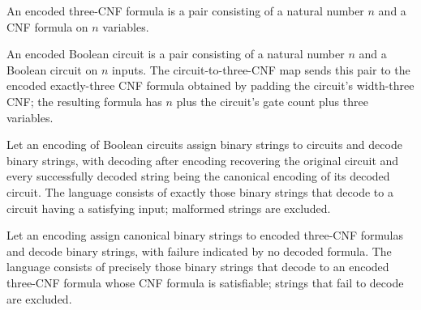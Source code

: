 \begin{definition}
\label{FABL.EncodedThreeCNF}
\leanok
{}
An encoded three-CNF formula is a pair consisting of a natural number $n$ and a CNF
formula on $n$ variables.
\end{definition}

\begin{definition}
\label{FABL.circuitToThreeCNF}
\leanok
{}
An encoded Boolean circuit is a pair consisting of a natural number $n$ and a Boolean
circuit on $n$ inputs. The circuit-to-three-CNF map sends this pair to the encoded
exactly-three CNF formula obtained by padding the circuit's width-three CNF; the
resulting formula has $n$ plus the circuit's gate count plus three variables.
\end{definition}

\begin{definition}
\label{FABL.encodedCircuitSatLanguage}
\leanok
{}
Let an encoding of Boolean circuits assign binary strings to circuits and decode binary
strings, with decoding after encoding recovering the original circuit and every
successfully decoded string being the canonical encoding of its decoded circuit. The
language consists of exactly those binary strings that decode to a circuit having a
satisfying input; malformed strings are excluded.
\end{definition}

\begin{definition}
\label{FABL.encodedThreeCNFSatLanguage}
\leanok
{}
Let an encoding assign canonical binary strings to encoded three-CNF formulas and decode
binary strings, with failure indicated by no decoded formula. The language consists of
precisely those binary strings that decode to an encoded three-CNF formula whose CNF
formula is satisfiable; strings that fail to decode are excluded.
\end{definition}

